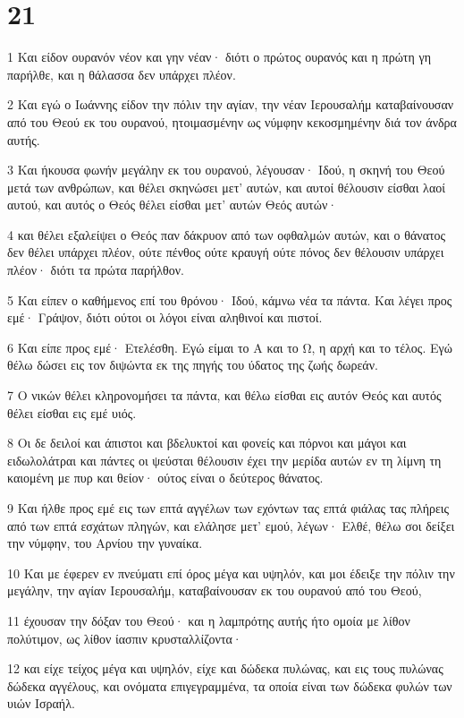 \chapter{21}

\par 1 Και είδον ουρανόν νέον και γην νέαν· διότι ο πρώτος ουρανός και η πρώτη γη παρήλθε, και η θάλασσα δεν υπάρχει πλέον.
\par 2 Και εγώ ο Ιωάννης είδον την πόλιν την αγίαν, την νέαν Ιερουσαλήμ καταβαίνουσαν από του Θεού εκ του ουρανού, ητοιμασμένην ως νύμφην κεκοσμημένην διά τον άνδρα αυτής.
\par 3 Και ήκουσα φωνήν μεγάλην εκ του ουρανού, λέγουσαν· Ιδού, η σκηνή του Θεού μετά των ανθρώπων, και θέλει σκηνώσει μετ' αυτών, και αυτοί θέλουσιν είσθαι λαοί αυτού, και αυτός ο Θεός θέλει είσθαι μετ' αυτών Θεός αυτών·
\par 4 και θέλει εξαλείψει ο Θεός παν δάκρυον από των οφθαλμών αυτών, και ο θάνατος δεν θέλει υπάρχει πλέον, ούτε πένθος ούτε κραυγή ούτε πόνος δεν θέλουσιν υπάρχει πλέον· διότι τα πρώτα παρήλθον.
\par 5 Και είπεν ο καθήμενος επί του θρόνου· Ιδού, κάμνω νέα τα πάντα. Και λέγει προς εμέ· Γράψον, διότι ούτοι οι λόγοι είναι αληθινοί και πιστοί.
\par 6 Και είπε προς εμέ· Ετελέσθη. Εγώ είμαι το Α και το Ω, η αρχή και το τέλος. Εγώ θέλω δώσει εις τον διψώντα εκ της πηγής του ύδατος της ζωής δωρεάν.
\par 7 Ο νικών θέλει κληρονομήσει τα πάντα, και θέλω είσθαι εις αυτόν Θεός και αυτός θέλει είσθαι εις εμέ υιός.
\par 8 Οι δε δειλοί και άπιστοι και βδελυκτοί και φονείς και πόρνοι και μάγοι και ειδωλολάτραι και πάντες οι ψεύσται θέλουσιν έχει την μερίδα αυτών εν τη λίμνη τη καιομένη με πυρ και θείον· ούτος είναι ο δεύτερος θάνατος.
\par 9 Και ήλθε προς εμέ εις των επτά αγγέλων των εχόντων τας επτά φιάλας τας πλήρεις από των επτά εσχάτων πληγών, και ελάλησε μετ' εμού, λέγων· Ελθέ, θέλω σοι δείξει την νύμφην, του Αρνίου την γυναίκα.
\par 10 Και με έφερεν εν πνεύματι επί όρος μέγα και υψηλόν, και μοι έδειξε την πόλιν την μεγάλην, την αγίαν Ιερουσαλήμ, καταβαίνουσαν εκ του ουρανού από του Θεού,
\par 11 έχουσαν την δόξαν του Θεού· και η λαμπρότης αυτής ήτο ομοία με λίθον πολύτιμον, ως λίθον ίασπιν κρυσταλλίζοντα·
\par 12 και είχε τείχος μέγα και υψηλόν, είχε και δώδεκα πυλώνας, και εις τους πυλώνας δώδεκα αγγέλους, και ονόματα επιγεγραμμένα, τα οποία είναι των δώδεκα φυλών των υιών Ισραήλ.
